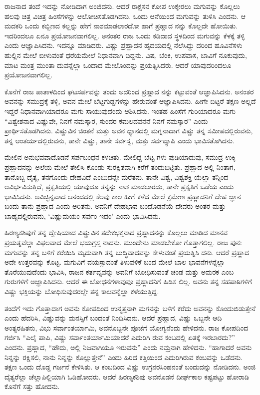 ರಾಜನಾದ ತಂದೆ ಇದನ್ನು ನೋಡಿದಾಗ ಅಂಜಿದನು. ಆದರೆ ರಾಕ್ಷಸನ ಕೋಪ ಉಕ್ಕೇರಲು ಮಗುವನ್ನು ಕೊಲ್ಲಲು ಹಲವು ಚಿತ್ರ ವಿಚಿತ್ರ ಹಿಂಸೆಗಳನ್ನು ಆಲೋಚಿಸತೊಡಗಿದನು. ಒಂದು ಆನೆಯಿಂದ ಮಗುವನ್ನು ತುಳಿಸಿ ಎಂದನು. ಆ ಮದಕರಿ ಒಂದು ಕಬ್ಬಿಣದ ಕಲ್ಲನ್ನು ಹೇಗೆ ನಾಶಮಾಡಲಾರದೋ ಹಾಗೆ ಪ್ರಹ್ಲಾದ ನನ್ನು ಕೊಲ್ಲದೇ ಹೋಯಿತು. ಇದರಿಂದಲೂ ಏನೂ ಪ್ರಯೋಜನವಾಗಲಿಲ್ಲ. ಅನಂತರ ರಾಜ ಒಂದು ಕಡಿದಾದ ಸ್ಥಳದಿಂದ ಮಗುವನ್ನು ಕೆಳಕ್ಕೆ ತಳ್ಳಿ ಎಂದು ಆಜ್ಞಾಪಿಸಿದನು. ಇದನ್ನೂ ಮಾಡಿದರು. ವಿಷ್ಣು ಪ್ರಹ್ಲಾದನ ಹೃದಯದಲ್ಲಿ ನೆಲೆಸಿದ್ದು ದರಿಂದ ಹೂವಿನೆಸಳು ಹುಲ್ಲಿನ ಮೇಲೆ ಬೀಳುವಂತೆ ಧರೆಯಮೇಲೆ ನಿಧಾನವಾಗಿ ಬಿದ್ದನು. ವಿಷ, ಬೆಂಕಿ, ಉಪವಾಸ, ಬಾವಿಗೆ ನೂಕುವುದು, ಮಾಟ ಮಂತ್ರ ಮುಂತಾ ದುವನ್ನೆಲ್ಲಾ ಒಂದಾದ ಮೇಲೊಂದನ್ನು ಪ್ರಯತ್ನಿಸಿದರು. ಆದರೆ ಯಾವುದರಿಂದಲೂ ಪ್ರಯೋಜನವಾಗಲಿಲ್ಲ.

ಕೊನೆಗೆ ರಾಜ ಪಾತಾಳದಿಂದ ಘಟಸರ್ಪವನ್ನು ತಂದು ಅದರಿಂದ ಪ್ರಹ್ಲಾದ ನನ್ನು ಕಟ್ಟುವಂತೆ ಆಜ್ಞಾಪಿಸಿದನು. ಅನಂತರ ಅವನನ್ನು ಸಮುದ್ರಕ್ಕೆ ತಳ್ಳಿ, ಅವನ ಮೇಲೆ ಬೆಟ್ಟಗುಡ್ಡಗಳನ್ನು ಹೇರುವಂತೆ ಆಜ್ಞಾಪಿಸಿದನು. ಹೀಗೇ ಬಿಟ್ಟರೆ ತಕ್ಷಣ ಅಲ್ಲದೆ ಇದ್ದರೆ ನಿಧಾನವಾಗಿಯಾದರೂ ಮಗು ಸಾಯುವುದೆಂದು ಆಶಿಸಿದನು. ಇಂತಹ ಹಿಂಸೆಗೆ ಗುರಿಯಾದರೂ ಮಗು “ವಿಶ್ವೇಶನಾದ ವಿಷ್ಣುವೇ, ನಿನಗೆ ನಮಸ್ಕಾರ, ಸುಂದರ ಕಮಲದವನನೆ ನಿನಗೆ ನಮಸ್ಕಾರ” ಎಂದು ಪ್ರಾರ್ಥಿಸತೊಡಗಿದನು. ವಿಷ್ಣುವಿನ ಚಿಂತನೆ ಮತ್ತು ಅವನ ಧ್ಯಾನದಲ್ಲಿ ಮಗ್ನನಾದಾಗ ವಿಷ್ಣು ತನ್ನ ಸಮೀಪದಲ್ಲಿರುವನು, ತನ್ನ ಆಂತರ್ಯದಲ್ಲಿರುವನು, ತಾನೇ ವಿಷ್ಣು, ತಾನೇ ಸರ್ವಸ್ವ, ಮತ್ತು ಸರ್ವವ್ಯಾಪಿ ಎಂದು ಭಾವಿಸತೊಗಿದನು.

ಮೇಲಿನ ಅನುಭವವಾದೊಡನೆ ಸರ್ಪಬಂಧನ ಕಳಚಿತು. ಮೇಲಿದ್ದ ಬೆಟ್ಟ ಗಳು ಪುಡಿಯಾದುವು, ಸಮುದ್ರ ಉಕ್ಕಿ ಪ್ರಹ್ಲಾದನನ್ನು ಅಲೆಯ ಮೇಲೆ ತೇಲಿಸಿ ಕೊಂಡು ಸುರಕ್ಷಿತವಾಗಿ ಕರೆಗೆ ತಂದುಬಿಟ್ಟಿತು. ಪ್ರಹ್ಲಾದ ಅಲ್ಲಿ ನಿಂತಾಗ, ತಾನೊಬ್ಬ ದೈತ್ಯ, ತನಗೊಂದು ದೇಹವಿದೆ ಎಂಬುದನ್ನೇ ಮರೆತನು. ತಾನೇ ವಿಶ್ವ, ವಿಶ್ವಶಕ್ತಿ ಯೆಲ್ಲಾ ತನ್ನಿಂದ ಆವಿರ್ಭವಿಸುತ್ತಿದೆ, ಪ್ರಕೃತಿಯಲ್ಲಿ ಯಾವುದೂ ತನ್ನನ್ನು ನಾಶ ಮಾಡಲಾರದು, ತಾನೇ ಪ್ರಕೃತಿಗೆ ಒಡೆಯ ಎಂದು ಭಾವಿಸಿದನು. ಅವಿಚ್ಛಿನ್ನವಾದ ಆನಂದದಲ್ಲಿ ಕೆಲವು ಕಾಲ ಹೀಗೆ ಕಳೆದ ಮೇಲೆ ಕ್ರಮೇಣ ಪ್ರಹ್ಲಾದನಿಗೆ ದೇಹ ಜ್ಞಾನ ಬಂದು ತಾನು ಪ್ರಹ್ಲಾದ ಎಂದು ಅರಿತನು. ಅವನಿಗೆ ದೇಹಭಾವ ಬಂದೊಡನೆಯೆ ದೇವರು ಅಂತರ ಮತ್ತು ಬಾಹ್ಯದಲ್ಲಿರುವನು, ‘ವಿಷ್ಣುಮಯಂ ಸರ್ವಂ ಇದಂ’ ಎಂದು ಭಾವಿಸಿದನು.

ಹಿರಣ್ಯಕಶಿಪುಗೆ ತನ್ನ ದ್ವೇಷಿಯಾದ ವಿಷ್ಣುವಿನ ತದೇಕಭಕ್ತನಾದ ಪ್ರಹ್ಲಾದನನ್ನು ಕೊಲ್ಲಲು ಮಾಡಿದ ಮಾನವ ಪ್ರಯತ್ನವೆಲ್ಲಾ ವಿಫಲವಾದ ಮೇಲೆ ಭಯಗ್ರಸ್ತ ನಾದನು. ಮುಂದೇನು ಮಾಡಬೇಕೋ ಗೊತ್ತಾಗಲಿಲ್ಲ. ರಾಜ ಪುನಃ ಮಗುವನ್ನು ತನ್ನ ಬಳಿಗೆ ಕರೆಯಿಸಿ ಮೃದುವಾಗಿ ತನ್ನ ಬುದ್ಧಿವಾದವನ್ನು ಕೇಳುವಂತೆ ಪ್ರಯತ್ನಿಸಿ ದನು. ಆದರೆ ಪ್ರಹ್ಲಾದ ಅದೇ ಉತ್ತರವನ್ನು ಕೊಟ್ಟ. ಮಗುವಿಗೆ ವಯಸ್ಸಾದಂತೆ ತಿಳುವಳಿಕೆ ಬಂದ ಮೇಲೆ ಬಾಲ ಭಾವನೆಗಳನ್ನೆಲ್ಲಾ ತೊರೆಯುವುದೆಂದು ಭಾವಿಸಿ, ರಾಜನ ಕರ್ತವ್ಯವನ್ನು ಅವನಿಗೆ ಬೋಧಿಸುವಂತೆ ಚಂಡ ಮತ್ತು ಅಮರಕ ಎಂಬ ಗುರುಗಳಿಗೆ ಅಜ್ಞಾಪಿಸಿದನು. ಆದರೆ ಈ ಬೋಧನೆಗಳಾವುವೂ ಪ್ರಹ್ಲಾದನಿಗೆ ಹಿಡಿಸ ಲಿಲ್ಲ. ಅವನು ತನ್ನ ಸಹಪಾಠಿಗಳಿಗೆ ವಿಷ್ಣು ಭಕ್ತಿಯನ್ನು ಬೋಧಿಸುವುದರಲ್ಲೇ ತನ್ನ ಕಾಲವನ್ನೆಲ್ಲಾ ಕಳೆಯುತ್ತಿದ್ದ.

ತಂದೆಗೆ ಇದು ಗೊತ್ತಾದಾಗ ಅವನು ಕೋಪದಿಂದ ಉನ್ಮತ್ತನಾಗಿ ಮಗನನ್ನು ಬಳಿಗೆ ಕರೆದು ಅವನನ್ನು ಕೊಂದುಬಿಡುತ್ತೇನೆ ಎಂದು ಹೆದರಿಸಿ, ವಿಷ್ಣುವನ್ನು ಮನಸ್ಸಿಗೆ ಬಂದಂತೆ ನಿಂದಿಸಿದನು. ಆದರೆ ಪ್ರಹ್ಲಾದ, ವಿಷ್ಣು ಒಬ್ಬನೇ ಆದಿ ಅಂತ್ಯರಹಿತನು, ವಿಭು ಸರ್ವಾಂತರ್ಯಾಮಿ, ಅವನೊಬ್ಬನೇ ಪೂಜೆಗೆ ಯೋಗ್ಯನೆಂದು ಹೇಳಿದನು. ರಾಜ ಕೋಪದಿಂದ ಗರ್ಜಿಸಿ “ಎಲೈ ಪಾಪಿ, ವಿಷ್ಣು ಸರ್ವಾಂತರ್ಯಾಮಿಯಾದರೆ ಎದುರಿಗಿ ರುವ ಕಂಬದಲ್ಲಿ ಏತಕ್ಕೆ ಇರಬಾರದು?” ಎಂದನು. ಪ್ರಹ್ಲಾದ, “ಹೌದು, ಅಲ್ಲಿ ನಿಜವಾಗಿಯೂ ಇರುವನು” ಎಂದು ನಮ್ರನಾಗಿ ಹೇಳಿದನು. “ಹಾಗಾದರೆ ಅವನು ನಿನ್ನನ್ನು ರಕ್ಷಿಸಲಿ, ನಾನು ನಿನ್ನನ್ನು ಕೊಲ್ಲುತ್ತೇನೆ” ಎಂದು ಹಿರಿದ ಕತ್ತಿಯಿಂದ ಎದುರಿಗಿರುವ ಕಂಬವನ್ನು ಒಡೆದನು. ತಕ್ಷಣ ಒಂದು ದೊಡ್ಡ ಗರ್ಜನೆ ಕೇಳಿಸಿತು. ಆ ಕಂಬದಿಂದ ವಿಷ್ಣು ಉಗ್ರನರಸಿಂಹನಂತೆ ಬಂದುದನ್ನು ನೋಡಿದನು. ಅಂಜಿ ದೈತ್ಯರೆಲ್ಲಾ ಚೆಲ್ಲಾಪಿಲ್ಲಿಯಾಗಿ ಓಡಿಹೋದರು. ಆದರೆ ಹಿರಣ್ಯಕಶಿಪು ಅವನೊಡನೆ ದೀರ್ಘಕಾಲ ಕಷ್ಟಪಟ್ಟು ಹೋರಾಡಿ ಕೊನೆಗೆ ಸತ್ತು ಹೋದನು.

